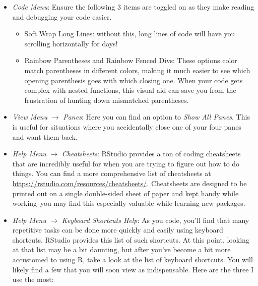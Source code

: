 \documentclass[
  letterpaper,
]{book}
\providecommand{\tightlist}{%
  \setlength{\itemsep}{0pt}\setlength{\parskip}{0pt}}\usepackage{longtable,booktabs,array}
\begin{document}
\begin{itemize}
\tightlist
\item
  \emph{Code Menu}: Ensure the following 3 items are toggled on as they
  make reading and debugging your code easier.

  \begin{itemize}
  \tightlist
  \item
    Soft Wrap Long Lines: without this, long lines of code will have you
    scrolling horizontally for days!
  \item
    Rainbow Parentheses and Rainbow Fenced Divs: These options color
    match parentheses in different colors, making it much easier to see
    which opening parenthesis goes with which closing one. When your
    code gets complex with nested functions, this visual aid can save
    you from the frustration of hunting down mismatched parentheses.
  \end{itemize}
\item
  \emph{View Menu} \(\rightarrow\) \emph{Panes}: Here you can find an
  option to \emph{Show All Panes}. This is useful for situations where
  you accidentally close one of your four panes and want them back.
\item
  \emph{Help Menu} \(\rightarrow\) \emph{Cheatsheets}: RStudio provides
  a ton of coding cheatsheets that are incredibly useful for when you
  are trying to figure out how to do things. You can find a more
  comprehensive list of cheatsheets at
  \url{https://rstudio.com/resources/cheatsheets/}. Cheatsheets are
  designed to be printed out on a single double-sided sheet of paper and
  kept handy while working--you may find this especially valuable while
  learning new packages.
\item
  \emph{Help Menu} \(\rightarrow\) \emph{Keyboard Shortcuts Help}: As
  you code, you'll find that many repetitive tasks can be done more
  quickly and easily using keyboard shortcuts. RStudio provides this
  list of such shortcuts. At this point, looking at that list may be a
  bit daunting, but after you've become a bit more accustomed to using
  R, take a look at the list of keyboard shortcuts. You will likely find
  a few that you will soon view as indispensable. Here are the three I
  use the most:


\end{itemize}
\end{document}
